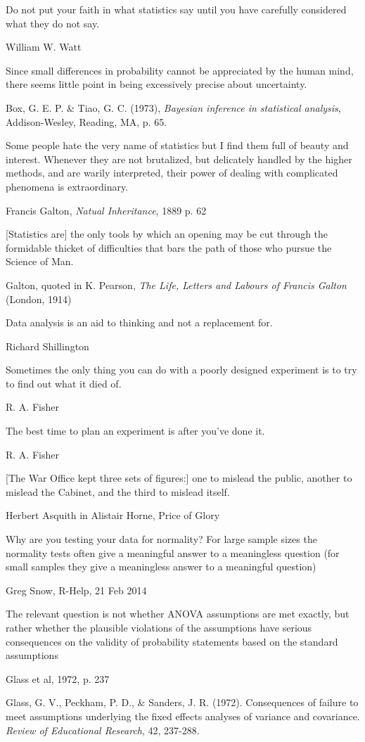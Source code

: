 \epigraph{Do not put your faith in what statistics say until you have carefully considered what they do not say.}{William W. Watt}

\epigraph{Since small differences in probability cannot be appreciated by the human mind, there seems little point in being excessively precise about uncertainty.}{Box, G. E. P. \& Tiao, G. C. (1973), \emph{Bayesian inference in statistical analysis}, Addison-Wesley, Reading, MA, p. 65.}

\epigraph{Some people hate the very name of statistics but I find them full of beauty and interest.  Whenever they are not brutalized, but delicately handled by the higher methods, and are warily interpreted,  their power of dealing with complicated phenomena is extraordinary.}{Francis Galton, \emph{Natual Inheritance}, 1889 p. 62}

\epigraph{[Statistics are] the only tools by which an opening may be cut through the formidable thicket of difficulties that bars the path of those who pursue the Science of Man.}{Galton, quoted in K. Pearson, \emph{The Life, Letters and Labours of Francis Galton} (London, 1914)}

\epigraph{Data analysis is an aid to thinking and not a replacement for.}{Richard Shillington}

\epigraph{Sometimes the only thing you can do with a poorly designed experiment is to try to find out what it died of.}{R. A. Fisher}

\epigraph{The best time to plan an experiment is after you've done it.}{R. A. Fisher}

\epigraph{[The War Office kept three sets of figures:] one to mislead the public, another to mislead the Cabinet, and the third to mislead itself.}{Herbert Asquith in Alistair Horne, Price of Glory}

\epigraph{Why are you testing your data for normality?  For large sample sizes the normality tests often give a meaningful answer to a meaningless question (for small samples they give a meaningless answer to a meaningful question)}{Greg Snow, R-Help, 21 Feb 2014}

\epigraph{The relevant question is not whether ANOVA assumptions are met exactly, but rather whether the plausible violations of the assumptions have serious consequences on the validity of probability statements based on the standard assumptions}{Glass et al, 1972, p. 237}
Glass, G. V., Peckham, P. D., \& Sanders, J. R. (1972). Consequences  of failure to meet
assumptions underlying the fixed effects analyses of variance and covariance.
\emph{Review of Educational Research},  42, 237-288.


